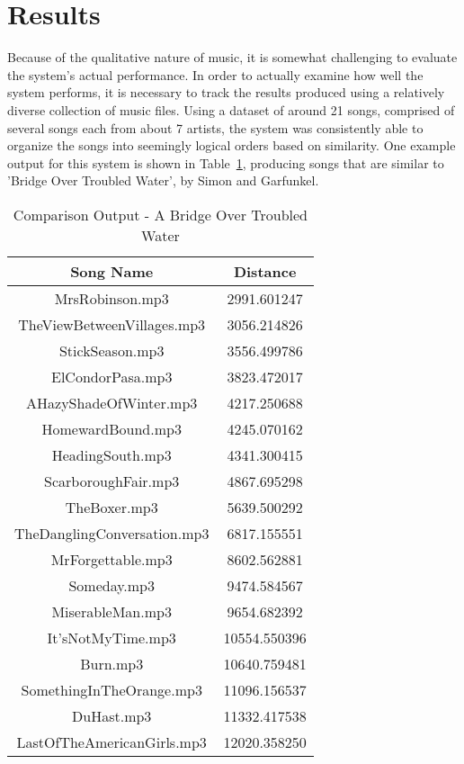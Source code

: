 \documentclass[conference]{IEEEtran}
\begin{document}
\section{Results}
Because of the qualitative nature of music, it is somewhat challenging to evaluate the system's actual performance. In order to actually examine how well the system performs, it is necessary to track the results produced using a relatively diverse collection of music files. Using a dataset of around 21 songs, comprised of several songs each from about 7 artists, the system was consistently able to organize the songs into seemingly logical orders based on similarity. One example output for this system is shown in Table~\ref{CompTab}, producing songs that are similar to 'Bridge Over Troubled Water', by Simon and Garfunkel.
\begin{table}[htbp]
  \caption{Comparison Output - A Bridge Over Troubled Water}
  \label{CompTab}
  \begin{center}
    \begin{tabular}{|c|c|}
      \hline
      \textbf{Song Name} & \textbf{Distance} \\
      \hline
      MrsRobinson.mp3 &  2991.601247 \\
      TheViewBetweenVillages.mp3 &  3056.214826 \\
      StickSeason.mp3 &  3556.499786 \\
      ElCondorPasa.mp3 &  3823.472017 \\
      AHazyShadeOfWinter.mp3 &  4217.250688 \\
      HomewardBound.mp3 &  4245.070162 \\ 
      HeadingSouth.mp3 &  4341.300415 \\
      ScarboroughFair.mp3 &  4867.695298 \\
      TheBoxer.mp3 &  5639.500292 \\
      TheDanglingConversation.mp3 &  6817.155551 \\
      MrForgettable.mp3 &  8602.562881 \\
      Someday.mp3 &  9474.584567 \\
      MiserableMan.mp3 &  9654.682392 \\
      It'sNotMyTime.mp3 & 10554.550396 \\
      Burn.mp3 & 10640.759481 \\
      SomethingInTheOrange.mp3 & 11096.156537 \\
      DuHast.mp3 & 11332.417538 \\
      LastOfTheAmericanGirls.mp3 & 12020.358250 \\

\end{tabular}
\end{center}
\end{table}
\end{document}
